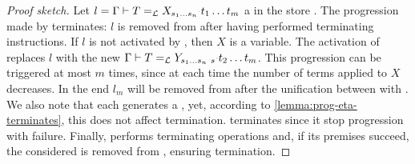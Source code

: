 \begin{proof}[Proof sketch]
  Let $l = \linkbetaM{\Gamma}{T}{\rhsBeta}$ a \linkbeta in the store \linkStore.
  The progression made by \progBetaRH{} terminates: $l$ is removed from
  \linkStore after having performed terminating instructions. If $l$ is not
  activated by \progBetaRH, then $X$ is a variable. The activation
  of \progBetaLL replaces $l$ with the new \linkbeta 
  $\linkbetaM{\Gamma}{T}{Y_{s_1\dots s_n~s}\appsep t_2\dots t_m}$.
  This progression can be triggered at most $m$ times, since at each time
  the number of terms applied to $X$ decreases. In the end $l_m$
  will be removed from \linkStore after the unification between \lhs with \rhs.
  We also note that each \progBetaLL generates a \linketa, yet, according to
  \cref{lemma:prog-eta-terminates}, this does not affect termination. 
  \progBetaFail terminates since it stop progression with failure.
  Finally, \progressetaright performs 
  terminating operations and, if its premises succeed, the considered
  \linketa is removed from \linkStore, ensuring termination.
\end{proof}



